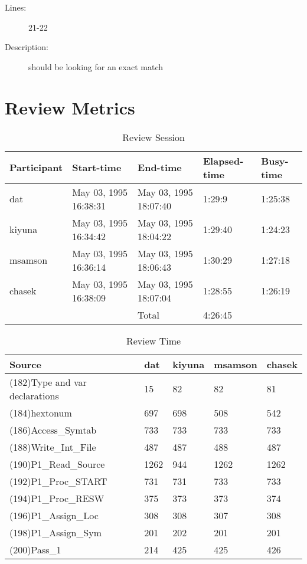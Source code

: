 \begin{enumerate}
\begin{description}
\item [Lines:] 21-22

\item [Description:] should be looking for an exact match
\end{description}
\end{enumerate}
\section{Review Metrics}
\begin{table}[hb]
\begin{center}
\begin{tabular}{|l|l|l|l|l|}
\hline
Participant & Start-time & End-time & Elapsed-time & Busy-time \\
\hline
dat & May 03, 1995 16:38:31 & May 03, 1995 18:07:40 & 1:29:9 & 1:25:38 \\
kiyuna & May 03, 1995 16:34:42 & May 03, 1995 18:04:22 & 1:29:40 & 1:24:23 \\
msamson & May 03, 1995 16:36:14 & May 03, 1995 18:06:43 & 1:30:29 & 1:27:18 \\
chasek & May 03, 1995 16:38:09 & May 03, 1995 18:07:04 & 1:28:55 & 1:26:19 \\
\hline
 & & Total & 4:26:45 & \\
\hline
\end{tabular}
\end{center}
\caption{Review Session}
\end{table}


\begin{table}[hb]
\begin{center}
\begin{tabular}{|l|l|l|l|l|}
\hline
Source & dat & kiyuna & msamson & chasek\\
\hline
(182)Type and var declarations & 15 & 82 & 82 & 81\\
(184)hextonum & 697 & 698 & 508 & 542\\
(186)Access\_Symtab & 733 & 733 & 733 & 733\\
(188)Write\_Int\_File & 487 & 487 & 488 & 487\\
(190)P1\_Read\_Source & 1262 & 944 & 1262 & 1262\\
(192)P1\_Proc\_START & 731 & 731 & 733 & 733\\
(194)P1\_Proc\_RESW & 375 & 373 & 373 & 374\\
(196)P1\_Assign\_Loc & 308 & 308 & 307 & 308\\
(198)P1\_Assign\_Sym & 201 & 202 & 201 & 201\\
(200)Pass\_1 & 214 & 425 & 425 & 426\\
\hline
\end{tabular}
\end{center}
\caption{Review Time}
\end{table}

